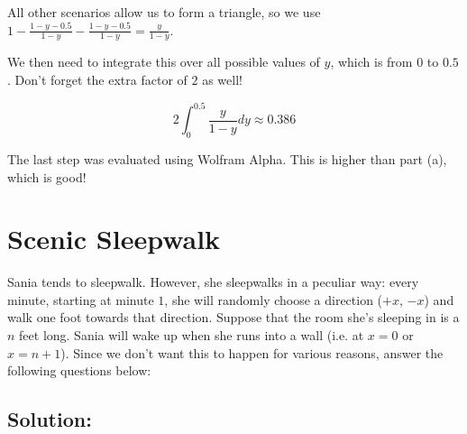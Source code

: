 \documentclass{article}
\begin{document}
\begin{enumerate}[label=(\alph*)]
    All other scenarios allow us to form a triangle, so we use $1 - \frac{1 - y - 0.5}{1 - y} - \frac{1 - y - 0.5}{1 - y} = \frac{y}{1 - y}$.
    
    We then need to integrate this over all possible values of $y$, which is from $0$ to $0.5$. Don't forget the extra factor of $2$ as well!
    
    $$2 \int_0^{0.5} \frac{y}{1 - y}dy \approx \boxed{0.386}$$
    
    The last step was evaluated using Wolfram Alpha. This is higher than part (a), which is good!
    
\end{enumerate}

\vspace{2cm}

\section{Scenic Sleepwalk}

Sania tends to sleepwalk. However, she sleepwalks in a peculiar way: every minute, starting at minute $1$, she will randomly choose a direction ($+x$, $-x$) and walk one foot towards that direction. Suppose that the room she's sleeping in is a $n$ feet long. Sania will wake up when she runs into a wall (i.e. at $x = 0$ or $x = n+1$). Since we don't want this to happen for various reasons, answer the following questions below:

\subsection{Solution:}
\end{document}
